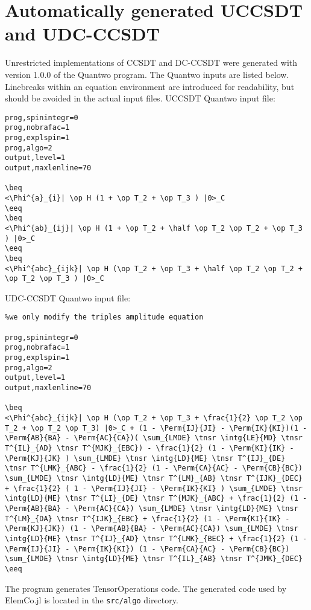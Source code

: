 \documentclass[a4paper,12pt,oneside]{book}
\newcommand{\veryshortarrow}[1][3pt]{\mathrel{%
   \hbox{\rule[\dimexpr\fontdimen22\textfont2-.2pt\relax]{#1}{.4pt}}%
   \mkern-4mu\hbox{\usefont{U}{lasy}{m}{n}\symbol{41}}}}
\newcommand{\op}{\hat}
\newcommand{\Perm}[2]{{\cal P}\left({#1}\veryshortarrow {#2}\right)}
\newcommand{\half}{\frac{1}{2}}
\newcommand{\ElemCojl}{\textsf{ElemCo.jl} }
\newcommand{\quantwo}{\textsf{Quantwo} }
\begin{document}
\chapter{Automatically generated UCCSDT and UDC-CCSDT}
Unrestricted implementations of CCSDT and DC-CCSDT\cite{kats19_dc,rishi19,schraivogel21_dc} were generated with version 1.0.0 of the \quantwo program\cite{quantwo}.
The \quantwo inputs are listed below. Linebreaks within an equation environment are introduced for readability, but should be avoided in the actual input files. \newline
\hspace{0pt} \newline
UCCSDT \quantwo input file:
\begin{lstlisting}[breaklines]
prog,spinintegr=0
prog,nobrafac=1
prog,explspin=1
prog,algo=2
output,level=1
output,maxlenline=70

\beq
<\Phi^{a}_{i}| \op H (1 + \op T_2 + \op T_3 ) |0>_C
\eeq
\beq
<\Phi^{ab}_{ij}| \op H (1 + \op T_2 + \half \op T_2 \op T_2 + \op T_3 ) |0>_C
\eeq
\beq
<\Phi^{abc}_{ijk}| \op H (\op T_2 + \op T_3 + \half \op T_2 \op T_2 + \op T_2 \op T_3 ) |0>_C
\end{lstlisting}
\hspace{0pt} \newline
UDC-CCSDT \quantwo input file:
\begin{lstlisting}[breaklines]
%singles and doubles amplitude equations from UCCSDT
%we only modify the triples amplitude equation

prog,spinintegr=0
prog,nobrafac=1
prog,explspin=1
prog,algo=2
output,level=1
output,maxlenline=70

\beq
<\Phi^{abc}_{ijk}| \op H (\op T_2 + \op T_3 + \frac{1}{2} \op T_2 \op T_2 + \op T_2 \op T_3) |0>_C + (1 - \Perm{IJ}{JI} - \Perm{IK}{KI})(1 - \Perm{AB}{BA} - \Perm{AC}{CA})( \sum_{LMDE} \tnsr \intg{LE}{MD} \tnsr T^{IL}_{AD} \tnsr T^{MJK}_{EBC}) - \frac{1}{2} (1 - \Perm{KI}{IK} - \Perm{KJ}{JK} ) \sum_{LMDE} \tnsr \intg{LD}{ME} \tnsr T^{IJ}_{DE} \tnsr T^{LMK}_{ABC} - \frac{1}{2} (1 - \Perm{CA}{AC} - \Perm{CB}{BC}) \sum_{LMDE} \tnsr \intg{LD}{ME} \tnsr T^{LM}_{AB} \tnsr T^{IJK}_{DEC} + \frac{1}{2} ( 1 - \Perm{IJ}{JI} - \Perm{IK}{KI} ) \sum_{LMDE} \tnsr \intg{LD}{ME} \tnsr T^{LI}_{DE} \tnsr T^{MJK}_{ABC} + \frac{1}{2} (1 - \Perm{AB}{BA} - \Perm{AC}{CA}) \sum_{LMDE} \tnsr \intg{LD}{ME} \tnsr T^{LM}_{DA} \tnsr T^{IJK}_{EBC} + \frac{1}{2} (1 - \Perm{KI}{IK} - \Perm{KJ}{JK}) (1 - \Perm{AB}{BA} - \Perm{AC}{CA}) \sum_{LMDE} \tnsr \intg{LD}{ME} \tnsr T^{IJ}_{AD} \tnsr T^{LMK}_{BEC} + \frac{1}{2} (1 - \Perm{IJ}{JI} - \Perm{IK}{KI}) (1 - \Perm{CA}{AC} - \Perm{CB}{BC}) \sum_{LMDE} \tnsr \intg{LD}{ME} \tnsr T^{IL}_{AB} \tnsr T^{JMK}_{DEC}
\eeq
\end{lstlisting}
\hspace{0pt} \newline
\noindent The program generates \textsf{TensorOperations} code.
The generated code  used by \ElemCojl is located in the \texttt{src/algo} directory. 


\end{document}
